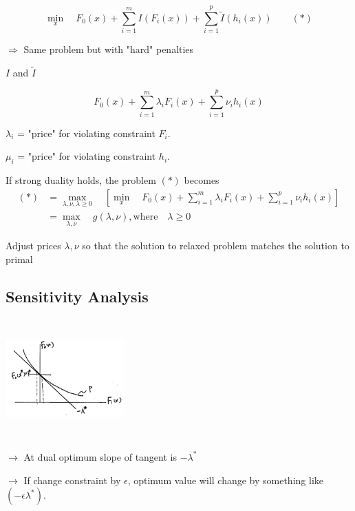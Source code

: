 \begin{equation*}
	\min_x\quad F_0(x) + \sum^m_{i=1}I(F_i(x)) + \sum^p_{i=1}\tilde{I}(h_i(x)) \qquad (*)
\end{equation*}

$\Rightarrow$ Same problem but with "hard" penalties

$I$ and $\tilde{I}$

\begin{equation*}
	F_0(x) + \sum^m_{i=1}\lambda_i F_i(x) + \sum^p_{i=1}\nu_i h_i(x)
\end{equation*}

$\lambda_i$ = "price" for violating constraint $F_i$.

$\mu_i$ = "price" for violating constraint $h_i$.

If strong duality holds, the problem $(*)$ becomes
\begin{align*}
	(*) 
	&= \max_{\lambda, \nu, \lambda \geq 0}\quad [\min_x\quad F_0(x) + \sum^m_{i=1}\lambda_iF_i(x) + \sum^p_{i=1}\nu_ih_i(x)]\\
	&= \max_{\lambda, \nu}\quad g(\lambda, \nu),\text{where}\quad \lambda \geq 0
\end{align*}

Adjust prices $\lambda, \nu$ so that the solution to relaxed problem matches the solution to primal
\subsection{Sensitivity Analysis}

\begin{marginfigure}
	\centering
	\includegraphics[width=1.8in,height=1.8in]{figures/ch10/figure1127_4.png}
\end{marginfigure}

$\rightarrow$ At dual optimum slope of tangent is $-\lambda^*$

$\rightarrow$
If change constraint by $\epsilon$, optimum value will change by something like $(-\epsilon \lambda^*)$.


